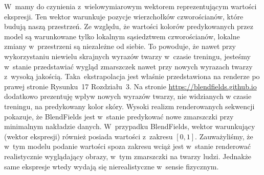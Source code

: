 \documentclass{rebuttal}
\begin{document}
  W~\blendfields mamy do czynienia z~wielowymiarowym wektorem reprezentującym
  wartości ekspresji. Ten wektor warunkuje pozycje wierzchołków czworościanów,
  które budują naszą przestrzeń. Ze względu, że wartości kolorów predykowanych
  przez model są warunkowane tylko lokalnym sąsiedztwem czworościanów, lokalne
  zmiany w~przestrzeni są niezależne od siebie. To powoduje, że nawet przy
  wykorzystaniu niewielu skrajnych wyrazów twarzy w~czasie treningu, jesteśmy
  w~stanie przedstawiać wygląd zmarszczek nawet przy nowych wyrazach twarzy
  z~wysoką jakością. Taka ekstrapolacja jest właśnie przedstawiona na renderze
  po prawej stronie Rysunku~17 Rozdziału~3. Na stronie
  \url{https://blendfields.github.io} dodatkowo prezentuję wpływ nowych wyrazów
  twarzy, nie widzianych w czasie treningu, na predykowany kolor skóry. Wysoki
  realizm renderowanych sekwencji pokazuje, że BlendFields jest w~stanie
  predykować nowe zmarszczki przy minimalnym nakładzie danych. W~przypadku
  BlendFields, wektor warunkujący (wektor ekspresji) również posiada wartości
  z~zakresu $[0, 1]$. Zauważyliśmy, że w~tym modelu podanie wartości spoza
  zakresu wciąż jest w~stanie renderować realistycznie wyglądający obrazy, w~tym
  zmarszczki na twarzy ludzi. Jednakże same ekspresje wtedy wydają się
  nierealistyczne w~sensie fizycznym.

  \responsedelimiter
\end{document}
